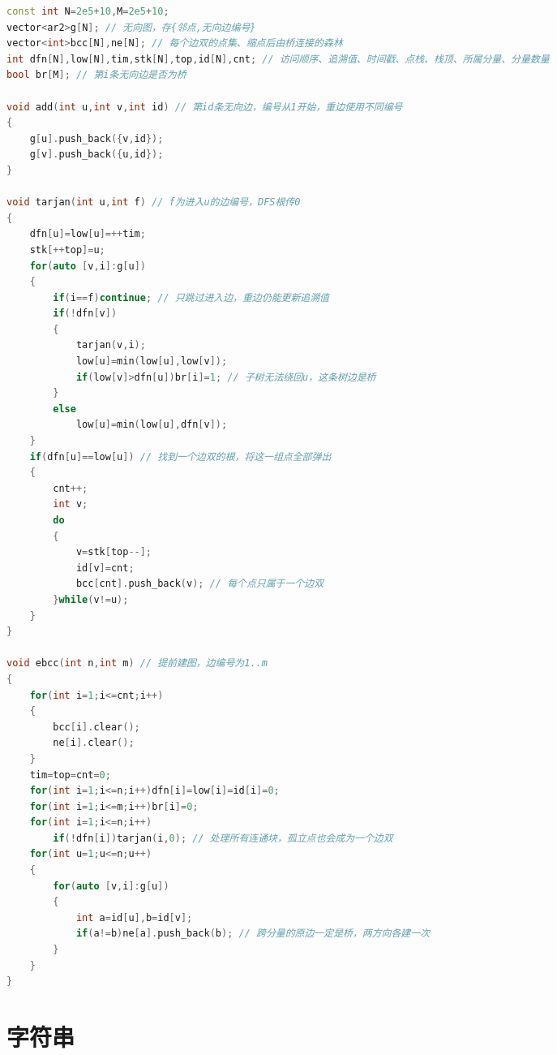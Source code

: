 \documentclass[10pt,landscape,a4paper]{article}
\begin{document}
\begin{multicols*}{3}
\begin{lstlisting}[language=C++]
const int N=2e5+10,M=2e5+10;
vector<ar2>g[N]; // 无向图，存{邻点,无向边编号}
vector<int>bcc[N],ne[N]; // 每个边双的点集、缩点后由桥连接的森林
int dfn[N],low[N],tim,stk[N],top,id[N],cnt; // 访问顺序、追溯值、时间戳、点栈、栈顶、所属分量、分量数量
bool br[M]; // 第i条无向边是否为桥

void add(int u,int v,int id) // 第id条无向边，编号从1开始，重边使用不同编号
{
    g[u].push_back({v,id});
    g[v].push_back({u,id});
}

void tarjan(int u,int f) // f为进入u的边编号，DFS根传0
{
    dfn[u]=low[u]=++tim;
    stk[++top]=u;
    for(auto [v,i]:g[u])
    {
        if(i==f)continue; // 只跳过进入边，重边仍能更新追溯值
        if(!dfn[v])
        {
            tarjan(v,i);
            low[u]=min(low[u],low[v]);
            if(low[v]>dfn[u])br[i]=1; // 子树无法绕回u，这条树边是桥
        }
        else
            low[u]=min(low[u],dfn[v]);
    }
    if(dfn[u]==low[u]) // 找到一个边双的根，将这一组点全部弹出
    {
        cnt++;
        int v;
        do
        {
            v=stk[top--];
            id[v]=cnt;
            bcc[cnt].push_back(v); // 每个点只属于一个边双
        }while(v!=u);
    }
}

void ebcc(int n,int m) // 提前建图，边编号为1..m
{
    for(int i=1;i<=cnt;i++)
    {
        bcc[i].clear();
        ne[i].clear();
    }
    tim=top=cnt=0;
    for(int i=1;i<=n;i++)dfn[i]=low[i]=id[i]=0;
    for(int i=1;i<=m;i++)br[i]=0;
    for(int i=1;i<=n;i++)
        if(!dfn[i])tarjan(i,0); // 处理所有连通块，孤立点也会成为一个边双
    for(int u=1;u<=n;u++)
    {
        for(auto [v,i]:g[u])
        {
            int a=id[u],b=id[v];
            if(a!=b)ne[a].push_back(b); // 跨分量的原边一定是桥，两方向各建一次
        }
    }
}
\end{lstlisting}
\section*{字符串}

\end{multicols*}
\end{document}
